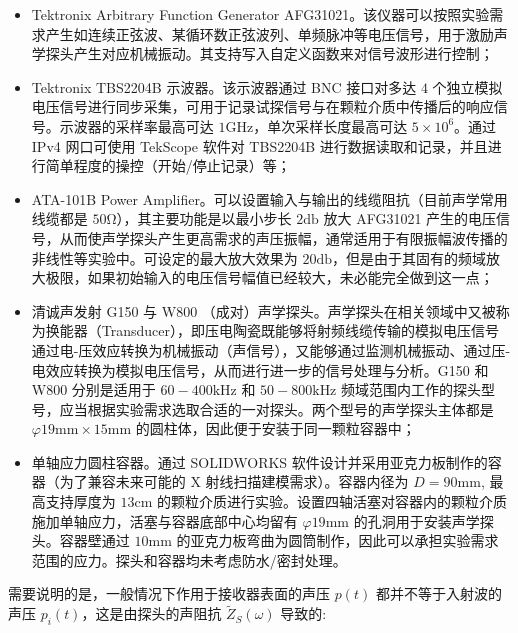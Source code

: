\begin{itemize}
  \item Tektronix Arbitrary Function Generator AFG31021。该仪器可以按照实验需求产生如连续正弦波、某循环数正弦波列、单频脉冲等电压信号，用于激励声学探头产生对应机械振动。其支持写入自定义函数来对信号波形进行控制；
  \item Tektronix TBS2204B 示波器。该示波器通过 BNC 接口对多达 $4$ 个独立模拟电压信号进行同步采集，可用于记录试探信号与在颗粒介质中传播后的响应信号。示波器的采样率最高可达 $1\unit{\giga\hertz}$，单次采样长度最高可达 $5\times 10^{6}$。通过 IPv4 网口可使用 TekScope 软件对 TBS2204B 进行数据读取和记录，并且进行简单程度的操控（开始/停止记录）等；
  \item ATA-101B Power Amplifier。可以设置输入与输出的线缆阻抗（目前声学常用线缆都是 $50\unit{\ohm}$），其主要功能是以最小步长 $2\unit{\decibel}$ 放大 AFG31021 产生的电压信号，从而使声学探头产生更高需求的声压振幅，通常适用于有限振幅波传播的非线性等实验中。可设定的最大放大效果为 $20\unit{\decibel}$，但是由于其固有的频域放大极限，如果初始输入的电压信号幅值已经较大，未必能完全做到这一点；
  \item 清诚声发射 G150 与 W800 （成对）声学探头。声学探头在相关领域中又被称为换能器（Transducer），即压电陶瓷既能够将射频线缆传输的模拟电压信号通过电-压效应转换为机械振动（声信号），又能够通过监测机械振动、通过压-电效应转换为模拟电压信号，从而进行进一步的信号处理与分析。G150 和 W800 分别是适用于 $60-400\unit{\kilo\Hz}$ 和 $50-800\unit{\kilo\hertz}$ 频域范围内工作的探头型号，应当根据实验需求选取合适的一对探头。两个型号的声学探头主体都是 $\varphi 19\unit{\milli\meter}\times 15\unit{\milli\meter}$ 的圆柱体，因此便于安装于同一颗粒容器中；
  \item 单轴应力圆柱容器。通过 SOLIDWORKS 软件设计并采用亚克力板制作的容器（为了兼容未来可能的 X 射线扫描建模需求）。容器内径为 $D = 90\unit{\milli\meter}$, 最高支持厚度为 $13\unit{\centi\meter}$ 的颗粒介质进行实验。设置四轴活塞对容器内的颗粒介质施加单轴应力，活塞与容器底部中心均留有 $\varphi 19\unit{\milli\meter}$ 的孔洞用于安装声学探头。容器壁通过 $10\unit{\milli\meter}$ 的亚克力板弯曲为圆筒制作，因此可以承担实验需求范围的应力。探头和容器均未考虑防水/密封处理。
\end{itemize}



需要说明的是，一般情况下作用于接收器表面的声压 $p(t)$ 都并不等于入射波的声压 $p_{i}(t)$，这是由探头的声阻抗 $\widetilde{Z}_{S}(\omega)$ 导致的:

